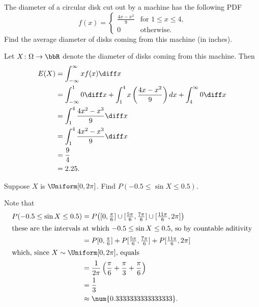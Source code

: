 \begin{problem}[Handout 12, \# 8]
  The diameter of a circular disk cut out by a machine has the following
  PDF
  \[
    f(x)=%
    \begin{cases}
      \frac{4x-x^2}{9}&\text{for \(1\leq x\leq 4\),}\\
      0&\text{otherwise.}
    \end{cases}
  \]
  Find the average diameter of disks coming from this machine (in inches).
\end{problem}
\begin{solution}
  Let \(X\colon\Omega\to\bbR\) denote the diameter of disks coming from
  this machine. Then
  \begin{align*}
    E(X) &=\int_{-\infty}^\infty xf(x) \diff x\\
         &=\int_{-\infty}^1 0\diff x%
           +\int_1^4 x \left(\frac{4x-x^2}{9}\right) dx%
           +\int_4^\infty 0\diff x\\
         &=\int_1^4 \frac{4x^2-x^3}{9} \diff x\\
         &=\int_1^4 \frac{4x^2-x^3}{9} \diff x\\
         &=\frac{9}{4}\\
         &=2.25.
  \end{align*}
\end{solution}
\newpage

\begin{problem}[Handout 12, \# 9]
  Suppose \(X\) is \(\Uniform[0,2 \pi]\). Find
  \(P(-0.5\leq \sin X\leq 0.5)\).
\end{problem}
\begin{solution}
  Note that
  \begin{align*}
    P(-0.5\leq\sin X\leq 0.5)
    &=P\bigl([0,\tfrac{\pi}{6}]\cup[\tfrac{5\pi}{6},\tfrac{7\pi}{6}]%
      \cup[\tfrac{11\pi}{6},2\pi]\bigr)\\
    \intertext{these are the intervals at which \(-0.5\leq \sin X\leq
    0.5\), so by countable aditivity}
    &=P[0,\tfrac{\pi}{6}]+P[\tfrac{5\pi}{6},\tfrac{7\pi}{6}]%
      +P[\tfrac{11\pi}{6},2\pi]\\
    \intertext{which, since \(X\sim\Uniform[0,2\pi]\), equals}
    &=\frac{1}{2\pi}%
      \left(\frac{\pi}{6}+\frac{\pi}{3}+\frac{\pi}{6}\right)\\
    &=\frac{1}{3}\\
    &\approx\num{0.3333333333333333}.
  \end{align*}
\end{solution}
\newpage

